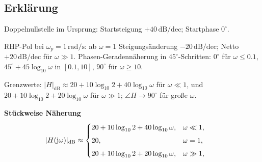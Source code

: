 \subsection{Erklärung}
\vspace{5mm}
\begin{description}[leftmargin=1.2em,labelsep=.6em,font=\bfseries]
\item[Schritt 1] Doppelnullstelle im Ursprung: Startsteigung $+40\,\mathrm{dB/dec}$; Startphase $0^\circ$.
\item[Schritt 2] RHP-Pol bei $\omega_p=1\,\mathrm{rad/s}$: ab $\omega=1$ Steigungsänderung $-20\,\mathrm{dB/dec}$; Netto $+20\,\mathrm{dB/dec}$ für $\omega\gg1$. Phasen-Geradennäherung in $45^\circ$-Schritten: $0^\circ$ für $\omega\le0.1$, $45^\circ+45\log_{10}\omega$ in $[0.1,10]$, $90^\circ$ für $\omega\ge10$.
\item[Schritt 3] Grenzwerte: $|H|_{\mathrm{dB}}\approx 20+10\log_{10}2+40\log_{10}\omega$ für $\omega\ll1$, und $20+10\log_{10}2+20\log_{10}\omega$ für $\omega\gg1$; $\angle H\to90^\circ$ für große $\omega$.
\end{description}

\vspace{0.5cm}
\medskip
\noindent\textbf{Stückweise Näherung}
\[
|H(\operatorname{j}\!\omega)|_{\mathrm{dB}}\approx
\begin{cases}
20+10\log_{10}2+40\log_{10}\omega,& \omega\ll1,\\[4pt]
20,& \omega=1,\\[4pt]
20+10\log_{10}2+20\log_{10}\omega,& \omega\gg1,
\end{cases}
\qquad
\]
\newpage